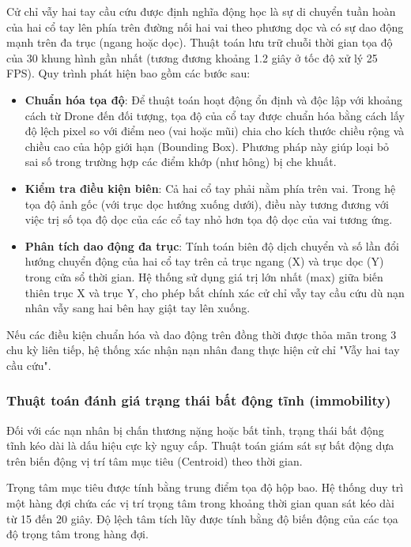 Cử chỉ vẫy hai tay cầu cứu được định nghĩa động học là sự di chuyển tuần hoàn của hai cổ tay lên phía trên đường nối hai vai theo phương dọc và có sự dao động mạnh trên đa trục (ngang hoặc dọc). Thuật toán lưu trữ chuỗi thời gian tọa độ của 30 khung hình gần nhất (tương đương khoảng 1.2 giây ở tốc độ xử lý 25 FPS). Quy trình phát hiện bao gồm các bước sau:

\begin{itemize}
    \item \textbf{Chuẩn hóa tọa độ}: Để thuật toán hoạt động ổn định và độc lập với khoảng cách từ Drone đến đối tượng, tọa độ của cổ tay được chuẩn hóa bằng cách lấy độ lệch pixel so với điểm neo (vai hoặc mũi) chia cho kích thước chiều rộng và chiều cao của hộp giới hạn (Bounding Box). Phương pháp này giúp loại bỏ sai số trong trường hợp các điểm khớp (như hông) bị che khuất.
    \item \textbf{Kiểm tra điều kiện biên}: Cả hai cổ tay phải nằm phía trên vai. Trong hệ tọa độ ảnh gốc (với trục dọc hướng xuống dưới), điều này tương đương với việc trị số tọa độ dọc của các cổ tay nhỏ hơn tọa độ dọc của vai tương ứng.
    \item \textbf{Phân tích dao động đa trục}: Tính toán biên độ dịch chuyển và số lần đổi hướng chuyển động của hai cổ tay trên cả trục ngang (X) và trục dọc (Y) trong cửa sổ thời gian. Hệ thống sử dụng giá trị lớn nhất (max) giữa biến thiên trục X và trục Y, cho phép bắt chính xác cử chỉ vẫy tay cầu cứu dù nạn nhân vẫy sang hai bên hay giật tay lên xuống.
\end{itemize}

Nếu các điều kiện chuẩn hóa và dao động trên đồng thời được thỏa mãn trong 3 chu kỳ liên tiếp, hệ thống xác nhận nạn nhân đang thực hiện cử chỉ "Vẫy hai tay cầu cứu".

\subsubsection{Thuật toán đánh giá trạng thái bất động tĩnh (immobility)}

Đối với các nạn nhân bị chấn thương nặng hoặc bất tỉnh, trạng thái bất động tĩnh kéo dài là dấu hiệu cực kỳ nguy cấp. Thuật toán giám sát sự bất động dựa trên biến động vị trí tâm mục tiêu (Centroid) theo thời gian.

Trọng tâm mục tiêu được tính bằng trung điểm tọa độ hộp bao. Hệ thống duy trì một hàng đợi chứa các vị trí trọng tâm trong khoảng thời gian quan sát kéo dài từ 15 đến 20 giây. Độ lệch tâm tích lũy được tính bằng độ biến động của các tọa độ trọng tâm trong hàng đợi.

